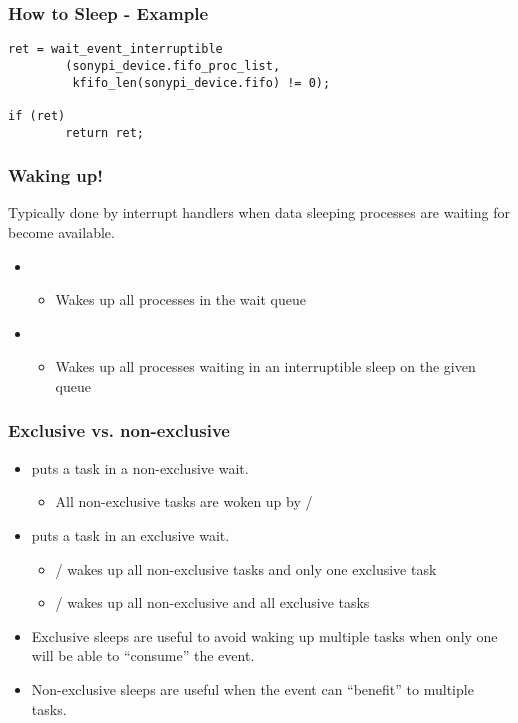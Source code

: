 \begin{frame}[fragile]
\frametitle{How to Sleep - Example}
\begin{verbatim}
ret = wait_event_interruptible
        (sonypi_device.fifo_proc_list,
         kfifo_len(sonypi_device.fifo) != 0);

if (ret)
        return ret;
\end{verbatim}
\end{frame}

\begin{frame}
  \frametitle{Waking up!}
  Typically done by interrupt handlers when data sleeping
  processes are waiting for become available.
  \begin{itemize}
  \item {}
    \begin{itemize}
    \item Wakes up all processes in the wait queue
    \end{itemize}
  \item {}
    \begin{itemize}
    \item Wakes up all processes waiting in an interruptible sleep
      on the given queue
    \end{itemize}
  \end{itemize}
\end{frame}

\begin{frame}
  \frametitle{Exclusive vs. non-exclusive}
  \begin{itemize}
  \item {} puts a task in a
    non-exclusive wait.
    \begin{itemize}
    \item All non-exclusive tasks are woken up by  /
    \end{itemize}
  \item {} puts a task in an
    exclusive wait.
    \begin{itemize}
    \item {} /  wakes up
      all non-exclusive tasks and only one exclusive task
    \item {} / 
      wakes up all non-exclusive and all exclusive tasks
    \end{itemize}
  \item Exclusive sleeps are useful to avoid waking up multiple tasks
    when only one will be able to ``consume'' the event.
  \item Non-exclusive sleeps are useful when the event can ``benefit''
    to multiple tasks.
  \end{itemize}
\end{frame}

